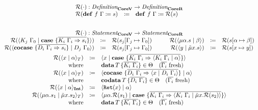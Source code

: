 \begin{gather*}
  \begin{array}{rcl}
    \multicolumn{3}{c}{\redundancy{\cdot} : \emph{Definition}_{\targetvar{}} \rightarrow \emph{Definition}_{\targetred{}}}\\
    \redundancy{\defi{f\ \Gamma}{s}} & \coloneq & \defi{f\ \Gamma}{\redundancy{s}} \\
  \end{array}
  \\\\
  \begin{array}{rclrcl}
    \multicolumn{6}{c}{\redundancy{\cdot} : \emph{Statement}_{\targetvar{}} \rightarrow \emph{Statement}_{\targetred{}}}\\
    \redundancy{\cut{K_j\ \Gamma_0}{\case{\overline{K_i\ \Gamma_i \Rightarrow s_i}}}} & \coloneq & \redundancy{s_j[\Gamma_j \mapsto \Gamma_0]} & \qquad
    \redundancy{\cut{\mu\alpha.s}{\beta}} & \coloneq & \redundancy{s[\alpha \mapsto \beta]} \\
    \redundancy{\cut{\cocase{\overline{D_i\ \Gamma_i \Rightarrow s_i}}}{D_j\ \Gamma_0}} & \coloneq & \redundancy{s_j[\Gamma_j \mapsto \Gamma_0]} &
    \redundancy{\cut{y}{\tilde{\mu}x.s}} & \coloneq & \redundancy{s[x \mapsto y]} \\
  \end{array}
  \\
  \begin{array}{rcl}
    \redundancy{\cut{x}{\alpha}_T} & \coloneq & \cut{x}{\case{\overline{K_i\ \Gamma_i \Rightarrow \cut{K_i\ \Gamma_i}{\alpha}}}} \\
    \text{where} &  & \data{T}{\overline{K_i\ \Gamma_i}} \in \Theta \quad \fresh{\overline{\Gamma_i}} \\
    \redundancy{\cut{x}{\alpha}_T} & \coloneq & \cut{\cocase{\overline{D_i\ \Gamma_i \Rightarrow \cut{x}{D_i\ \Gamma_i}}}}{\alpha} \\
    \text{where} &  & \codata{T}{\overline{D_i\ \Gamma_i}} \in \Theta \quad \fresh{\overline{\Gamma_i}} \\
    \redundancy{\cut{x}{\alpha}_\tyint} & \coloneq & \cut{\mathtt{Ret}(x)}{\alpha} \\
    \redundancy{\cut{\mu\alpha.s_1}{\tilde{\mu}x.s_2}_T} & \coloneq & \cut{\mu\alpha.\redundancy{s_1}}{\case{\overline{K_i\ \Gamma_i \Rightarrow \cut{K_i\ \Gamma_i}{\tilde{\mu}x.\redundancy{s_2}}}}} \\
    \text{where} &  & \data{T}{\overline{K_i\ \Gamma_i}} \in \Theta \quad \fresh{\overline{\Gamma_i}} \\

\end{array}
\end{gather*}
